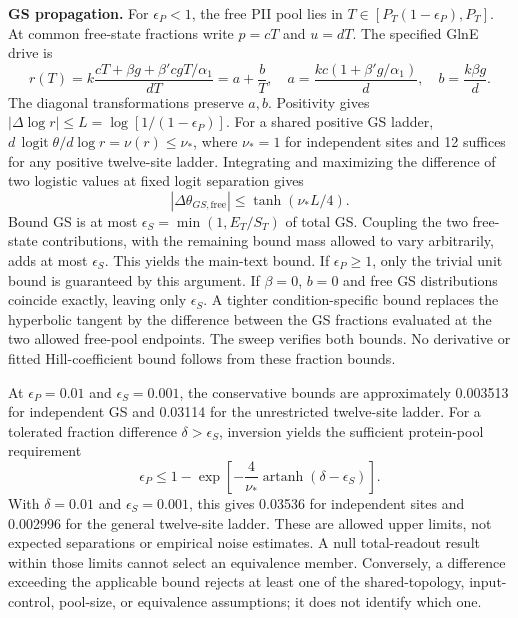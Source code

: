 \documentclass[11pt]{article}
\begin{document}
\textbf{GS propagation.} For $\epsilon_P<1$, the free PII pool lies in $T\in[P_T(1-\epsilon_P),P_T]$. At common free-state fractions write $p=cT$ and $u=dT$. The specified GlnE drive is
\[
 r(T)=k\frac{cT+\beta g+\beta'cgT/\alpha_1}{dT}
     =a+\frac{b}{T},\quad
 a=\frac{kc(1+\beta'g/\alpha_1)}d,\quad b=\frac{k\beta g}d.
\]
The diagonal transformations preserve $a,b$. Positivity gives $|\Delta\log r|\leq L=\log[1/(1-\epsilon_P)]$. For a shared positive GS ladder, $d\,\operatorname{logit}\theta/d\log r=\nu(r)\leq\nu_*$, where $\nu_*=1$ for independent sites and 12 suffices for any positive twelve-site ladder. Integrating and maximizing the difference of two logistic values at fixed logit separation gives
\[
 |\Delta\theta_{GS,\mathrm{free}}|\leq\tanh(\nu_*L/4).
\]
Bound GS is at most $\epsilon_S=\min(1,E_T/S_T)$ of total GS. Coupling the two free-state contributions, with the remaining bound mass allowed to vary arbitrarily, adds at most $\epsilon_S$. This yields the main-text bound. If $\epsilon_P\geq1$, only the trivial unit bound is guaranteed by this argument. If $\beta=0$, $b=0$ and free GS distributions coincide exactly, leaving only $\epsilon_S$. A tighter condition-specific bound replaces the hyperbolic tangent by the difference between the GS fractions evaluated at the two allowed free-pool endpoints. The sweep verifies both bounds. No derivative or fitted Hill-coefficient bound follows from these fraction bounds.

At $\epsilon_P=0.01$ and $\epsilon_S=0.001$, the conservative bounds are approximately 0.003513 for independent GS and 0.03114 for the unrestricted twelve-site ladder. For a tolerated fraction difference $\delta>\epsilon_S$, inversion yields the sufficient protein-pool requirement
\[
 \epsilon_P\leq1-\exp\left[-\frac{4}{\nu_*}\operatorname{artanh}(\delta-\epsilon_S)\right].
\]
With $\delta=0.01$ and $\epsilon_S=0.001$, this gives 0.03536 for independent sites and 0.002996 for the general twelve-site ladder. These are allowed upper limits, not expected separations or empirical noise estimates. A null total-readout result within those limits cannot select an equivalence member. Conversely, a difference exceeding the applicable bound rejects at least one of the shared-topology, input-control, pool-size, or equivalence assumptions; it does not identify which one.
\end{document}
